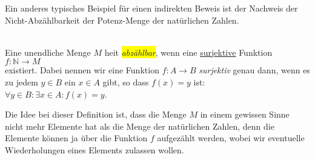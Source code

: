 Ein anderes typisches Beispiel f\"{u}r einen indirekten Beweis ist der Nachweis der
Nicht-Abz\"{a}hlbarkeit der Potenz-Menge der nat\"{u}rlichen Zahlen.

\begin{Definition} \hspace*{\fill} \\
Eine unendliche Menge $M$ hei\3t \colorbox{yellow}{\emph{abz\"{a}hlbar}}, wenn eine 
\underline{sur}j\underline{ektive} Funktion
\\[0.2cm]
\hspace*{1.3cm}
$f: \mathbb{N} \rightarrow M$
\\[0.2cm]
existiert.  Dabei nennen wir eine Funktion $f:A \rightarrow B$  \emph{surjektiv} genau
dann, wenn es zu jedem $y \in B$ ein $x \in A$ gibt, so dass $f(x) = y$ ist:
\\[0.2cm]
\hspace*{1.3cm}
$\forall y \in B: \exists x \in A: f(x) = y$.  \eox
\end{Definition}

Die Idee bei dieser Definition ist, dass die Menge  $M$ in einem gewissen Sinne nicht mehr Elemente hat
als die Menge der nat\"{u}rlichen Zahlen, denn die Elemente k\"{o}nnen ja \"{u}ber die Funktion $f$
aufgez\"{a}hlt werden, wobei wir eventuelle Wiederholungen eines Elements zulassen wollen.

